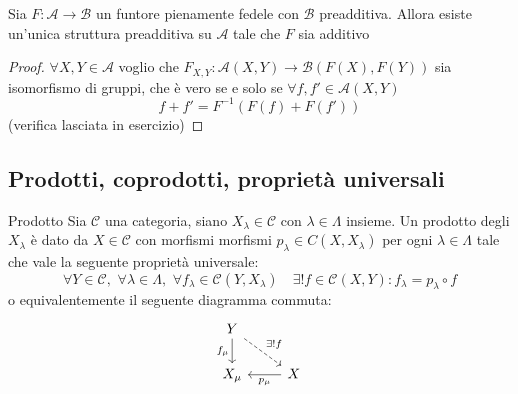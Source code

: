\begin{remark}{}
    Sia \(F : \mathcal{A} \to \mathcal{B}\) un funtore pienamente fedele con \(\mathcal{B}\) preadditiva.
    Allora esiste un'unica struttura preadditiva su \(\mathcal{A}\) tale che \(F\) 
    sia additivo
\end{remark}
\begin{proof}{}
    \(\forall X, Y \in \mathcal{A}\) voglio che \(F_{X,Y}  : \mathcal{A}{(X, Y)} \to \mathcal{B}{(F{(X)}, F{(Y)})}\) sia isomorfismo di gruppi, che è vero se e solo se \(\forall f, f' \in \mathcal{A}{(X,Y)}\) 
    \[
      f + f' = F^{-1}{(F{(f)} + F{(f')})} 
    \]
    (verifica lasciata in esercizio) %
\end{proof}

\subsection{Prodotti, coprodotti, proprietà universali}

\begin{definition}{Prodotto}
Sia \(\mathcal{C}\) una categoria, siano \(
X_\lambda \in \mathcal{C}\) con \(\lambda \in \Lambda\) insieme. Un prodotto
degli \(
X_\lambda\) è dato da \(X \in \mathcal{C}\) con morfismi morfismi \(p_\lambda
\in C{(X, X_\lambda)}\) per ogni \(\lambda \in \Lambda\) tale che
vale la seguente proprietà universale:
\[
  \forall Y \in \mathcal{C}, \,\, \forall \lambda \in \Lambda, \,\, \forall f_{\lambda} \in \mathcal{C}{(Y, X_\lambda)} \quad \exists ! f \in \mathcal{C}{(X, Y)} : f_\lambda = p_\lambda \circ f
\]
o equivalentemente il seguente diagramma commuta:
\[\begin{tikzcd}
	Y \\
	{X_\mu} & X
	\arrow["{f_\mu}"', from=1-1, to=2-1]
	\arrow["{\exists ! f}", dashed, from=1-1, to=2-2]
	\arrow["{p_\mu}", from=2-2, to=2-1]
\end{tikzcd}\]
\end{definition}

